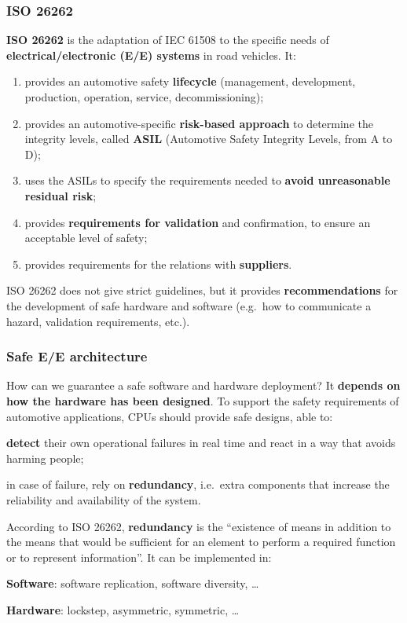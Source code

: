 \subsubsection{ISO 26262}
\textbf{ISO 26262} is the adaptation of IEC 61508 to the specific needs of \textbf{electrical/electronic (E/E) systems} in road vehicles. It:
\begin{enumerate}
    \item provides an automotive safety \textbf{lifecycle} (management, development, production, operation, service, decommissioning);
    \item provides an automotive-specific \textbf{risk-based approach} to determine the integrity levels, called \textbf{ASIL} (Automotive Safety Integrity Levels, from A to D);
    \item uses the ASILs to specify the requirements needed to \textbf{avoid unreasonable residual risk};
    \item provides \textbf{requirements for validation} and confirmation, to ensure an acceptable level of safety;
    \item provides requirements for the relations with \textbf{suppliers}.
\end{enumerate}

ISO 26262 does not give strict guidelines, but it provides \textbf{recommendations} for the development of safe hardware and software (e.g.\ how to communicate a hazard, validation requirements, etc.).

\subsubsection{Safe E/E architecture}
How can we guarantee a safe software and hardware deployment? It \textbf{depends on how the hardware has been designed}.
To support the safety requirements of automotive applications, CPUs should provide safe designs, able to:
\begin{compactitemize}
    \item \textbf{detect} their own operational failures in real time and react in a way that avoids harming people;
    \item in case of failure, rely on \textbf{redundancy}, i.e.\ extra components that increase the reliability and availability of the system.
\end{compactitemize}

According to ISO 26262, \textbf{redundancy} is the ``existence of means in addition to the means that would be sufficient for an element to perform a required function or to represent information''.
It can be implemented in:
\begin{compactitemize}
    \item \textbf{Software}: software replication, software diversity, \dots
    \item \textbf{Hardware}: lockstep, asymmetric, symmetric, \dots
\end{compactitemize}

